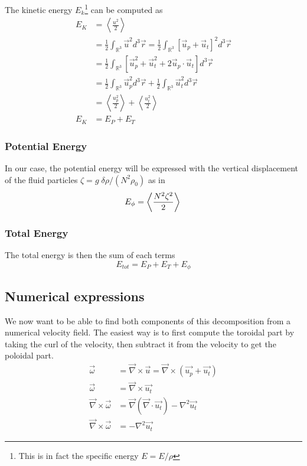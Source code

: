 The kinetic energy $E_k$\footnote{This is in fact the specific energy $E = E/\rho$} can be computed as 
\begin{align*}
	E_K & = \left\langle \frac{ u^2 }{2} \right\rangle \\
	& = \frac{1}{2} \int_{\mathbb{R}^3} \vec{u}^2 d^3 \vec{r}  = \frac{1}{2} \int_{\mathbb{R}^3} \left[ \vec{u}_p + \vec{u}_t \right]^2 d^3 \vec{r}  \\
	& = \frac{1}{2} \int_{\mathbb{R}^3} \left[ \vec{u}_p^2 + \vec{u}_t^2 + 2 \vec{u}_p \cdot \vec{u}_t \right] d^3 \vec{r}  \\
	& = \frac{1}{2} \int_{\mathbb{R}^3} \vec{u}_p^2 d^3 \vec{r} + \frac{1}{2} \int_{\mathbb{R}^3} \vec{u}_t^2 d^3 \vec{r}  \\
	& = \left\langle \frac{ u_p^2 }{2} \right\rangle + \left\langle \frac{ u_t^2 }{2} \right\rangle \\
	E_K & = E_P + E_T
\end{align*}

\subsubsection{Potential Energy}

In our case, the potential energy will be expressed with the vertical displacement of the fluid particles $\zeta = g \; \delta \rho / (N^2 \rho_0)$ as in \cite{augier_turbulence_2011} 
\begin{equation*}
	E_\phi = \left\langle \frac{N^2 \zeta^2}{2} \right\rangle \\
\end{equation*}

\subsubsection{Total Energy}
The total energy is then the sum of each terms
\begin{equation}
	E_{tot} = E_P + E_T + E_\phi \label{eq:Energy}
\end{equation}

 
\subsection{Numerical expressions}
We now want to be able to find both components of this decomposition from a numerical velocity field. The easiest way is to first compute the toroidal part by taking the curl of the velocity, then subtract it from the velocity to get the poloidal part.
\begin{align*}
	\vec{\omega} & = \vec{\nabla} \times \vec{u} = \vec{\nabla} \times \left( \vec{u_p} + \vec{u_t} \right)  \\
	\vec{\omega} & = \vec{\nabla} \times \vec{u_t} \\
	\vec{\nabla} \times \vec{\omega} & = \vec{\nabla} \left( \vec{\nabla} \cdot \vec{u_t} \right) - \nabla^2 \vec{u_t} \\
	\vec{\nabla} \times \vec{\omega} & = -\nabla^2 \vec{u_t} 
\end{align*}

